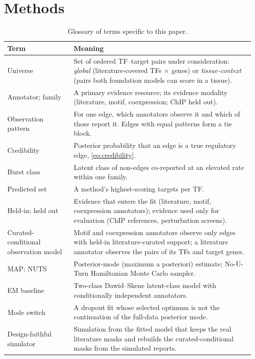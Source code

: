 \section{Methods}\label{sec:methods}

\begin{table}[!t]
  \centering
  \caption{Glossary of terms specific to this paper.}
  \label{tab:glossary}
  \small
  \begin{tabular}{@{}p{}p{}@{}}
    \toprule
    Term & Meaning \\
    \midrule
    Universe & Set of ordered TF--target pairs under consideration: \emph{global} (literature-covered TFs $\times$ genes) or \emph{tissue-context} (pairs both foundation models can score in a tissue). \\
    Annotator; family & A primary evidence resource; its evidence modality (literature, motif, coexpression; ChIP held out). \\
    Observation pattern & For one edge, which annotators observe it and which of those report it. Edges with equal patterns form a tie block. \\
    Credibility & Posterior probability that an edge is a true regulatory edge, \cref{eq:credibility}. \\
    Burst class & Latent class of non-edges co-reported at an elevated rate within one family. \\
    Predicted set & A method's \nTopK{} highest-scoring targets per TF. \\
    Held-in; held out & Evidence that enters the fit (literature, motif, coexpression annotators); evidence used only for evaluation (ChIP references, perturbation screens). \\
    Curated-conditional observation model & Motif and coexpression annotators observe only edges with held-in literature-curated support; a literature annotator observes the pairs of its TFs and target genes. \\
    MAP; NUTS & Posterior-mode (maximum a posteriori) estimate; No-U-Turn Hamiltonian Monte Carlo sampler. \\
    EM baseline & Two-class Dawid--Skene latent-class model with conditionally independent annotators. \\
    Mode switch & A dropout fit whose selected optimum is not the continuation of the full-data posterior mode. \\
    Design-faithful simulator & Simulation from the fitted model that keeps the real literature masks and rebuilds the curated-conditional masks from the simulated reports. \\

\end{tabular}
\end{table}
